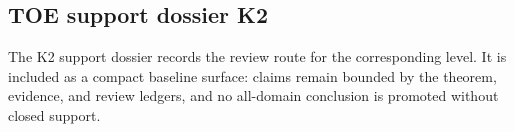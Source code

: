 \subsection{TOE support dossier K2}
The K2 support dossier records the review route for the corresponding level. It is included as a compact baseline surface: claims remain bounded by the theorem, evidence, and review ledgers, and no all-domain conclusion is promoted without closed support.

